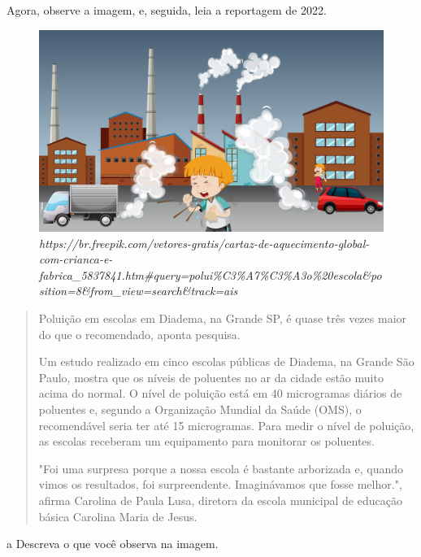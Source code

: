 

Agora, observe a imagem, e, seguida, leia a reportagem de 2022.

\begin{figure}[htpb!]
\includegraphics[width=.5\textwidth]{./imgs/img34.png}
\caption{\emph{https://br.freepik.com/vetores-gratis/cartaz-de-aquecimento-global-com-crianca-e-fabrica\_5837841.htm\#query=polui\%C3\%A7\%C3\%A3o\%20escola\&position=8\&from\_view=search\&track=ais}}
\end{figure}

\begin{quote}
Poluição em escolas em Diadema, na Grande SP, é quase três vezes maior
do que o recomendado, aponta pesquisa.

Um estudo realizado em cinco escolas públicas de Diadema, na Grande São
Paulo, mostra que os níveis de poluentes no ar da cidade estão muito
acima do normal. O nível de poluição está em 40 microgramas diários de
poluentes e, segundo a Organização Mundial da Saúde (OMS), o
recomendável seria ter até 15 microgramas. Para medir o nível de
poluição, as escolas receberam um equipamento para monitorar os
poluentes.

"Foi uma surpresa porque a nossa escola é bastante arborizada e, quando
vimos os resultados, foi surpreendente. Imaginávamos que fosse melhor.",
afirma Carolina de Paula Lusa, diretora da escola municipal de educação
básica Carolina Maria de Jesus.

\end{quote}

\num{a} Descreva o que você observa na imagem.


